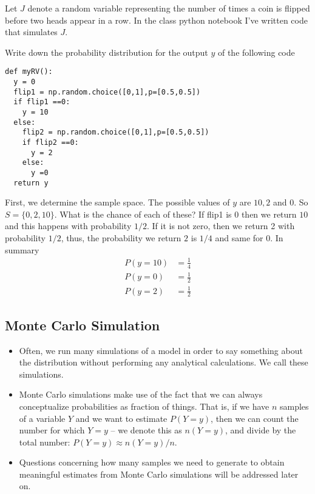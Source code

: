 \begin{example}
Let $J$ denote a random variable representing the number of times a coin is flipped before two heads appear in a row. In the class python notebook I've written code that simulates $J$. 
\end{example}


\begin{example}\label{ex:probfromcode}
Write down the probability distribution for the output $y$ of the following code
\begin{Verbatim}
def myRV():
  y = 0
  flip1 = np.random.choice([0,1],p=[0.5,0.5])
  if flip1 ==0:
    y = 10
  else:
    flip2 = np.random.choice([0,1],p=[0.5,0.5])
    if flip2 ==0:
      y = 2
    else:
      y =0
  return y
\end{Verbatim}
First, we determine the sample space. The possible values of $y$ are $10,2$ and $0$. So $S = \{0,2,10\}$. What is the chance of each of these? If flip1 is $0$ then we return $10$ and this happens with probability $1/2$. If it is not zero, then we return 2 with probability $1/2$, thus, the probability we return $2$ is $1/4$ and same for $0$. In summary
\begin{align*}
P(y = 10) &= \frac{1}{4}\\
P(y = 0) &= \frac{1}{2}\\
P(y = 2) &= \frac{1}{2}
\end{align*}
\end{example}




\subsection{Monte Carlo Simulation}
\begin{itemize}
\item  Often, we run many simulations of a model in order to say something about the distribution without performing any analytical calculations. We call these  simulations. 
\item Monte Carlo simulations make use of the fact that we can always conceptualize probabilities as fraction of things. That is, if we have $n$ samples of a variable $Y$ and we want to estimate $P(Y=y)$, then we can count the number for which $Y=y$ -- we denote this as $n(Y=y)$, and divide by the total number: $P(Y=y) \approx n(Y=y)/n$. 
\item Questions concerning how many samples we need to generate to obtain meaningful estimates from Monte Carlo simulations will be addressed later on. 
\end{itemize}


